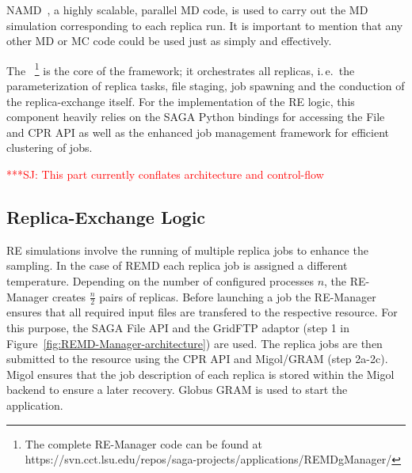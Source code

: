 \documentclass{rspublic}
\newcommand{\alnote}[1]{ {\textcolor{blue} { ***AL: #1 }}}
\newcommand{\jhanote}[1]{ {\textcolor{red} { ***SJ: #1 }}}
\newcommand{\alnote}[1]{}
\newcommand{\jhanote}[1]{}
\newcommand{\remanager}[1]{RE-Manager }
\begin{document}
NAMD~\citep{Phillips:2005gd}, a highly scalable, parallel MD
code, is used to carry out the MD simulation corresponding to each
replica run. It is important to mention that any other MD or MC code 
could be used just as simply and effectively.

The \emph{\remanager}~\footnote{The complete \remanager\ code can be found
at https://svn.cct.lsu.edu/repos/saga-projects/applications/REMDgManager/} 
is the core of the framework; it orchestrates all replicas, i.\,e.\ 
the parameterization of replica tasks, file staging, job spawning and 
the conduction of the replica-exchange itself. For the implementation 
of the RE logic, this component heavily relies on the SAGA Python bindings 
for accessing the File and CPR API as well as the enhanced job management 
framework for efficient clustering of jobs.

                                  

\jhanote{This part currently conflates architecture and control-flow}
                       
\subsection{Replica-Exchange Logic}
                                            
RE simulations involve the running of multiple replica jobs to enhance the sampling. 
In the case of REMD each replica job is assigned a different temperature.  
Depending on the number of configured processes $n$, the \remanager\
creates $\frac{n}{2}$ pairs of replicas.
Before launching a job the \remanager\ ensures that all required input 
files are transfered to the respective resource. For this purpose, the SAGA File API and the
GridFTP adaptor (step 1 in Figure~\ref{fig:REMD-Manager-architecture})
are used.  The replica jobs are then submitted to the resource
using the CPR API and Migol/GRAM (step 2a-2c). Migol ensures that the
job description of each replica is stored within the Migol backend
to ensure a later recovery. Globus GRAM is used to start the
application.
\end{document}
